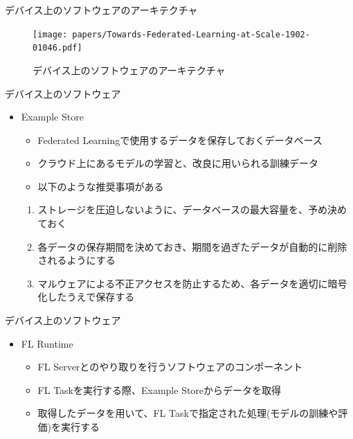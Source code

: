 \documentclass[dvipdfmx,notheorems,t]{beamer}
\begin{document}
\begin{frame}{デバイス上のソフトウェアのアーキテクチャ}

\begin{figure}
	\centering
	\texttt{[image: papers/Towards-Federated-Learning-at-Scale-1902-01046.pdf]}
	\caption{デバイス上のソフトウェアのアーキテクチャ~\cite{DBLP:journals/corr/abs-1902-01046}}
	\label{fig:fl-device-arch}
\end{figure}

\end{frame}

\begin{frame}{デバイス上のソフトウェア}

\begin{itemize}
	\item \alert{Example Store}
	\begin{itemize}
		\item Federated Learningで使用するデータを保存しておくデータベース
		\item クラウド上にあるモデルの学習と、改良に用いられる訓練データ
		\newline
		
		\item 以下のような推奨事項がある
	\end{itemize}
	
	\begin{enumerate}
		\item ストレージを圧迫しないように、データベースの最大容量を、予め決めておく
		\item 各データの保存期間を決めておき、期間を過ぎたデータが自動的に削除されるようにする
		\item マルウェアによる不正アクセスを防止するため、各データを適切に暗号化したうえで保存する
	\end{enumerate}
\end{itemize}

\end{frame}

\begin{frame}{デバイス上のソフトウェア}

\begin{itemize}
	\item \alert{FL Runtime}
	\begin{itemize}
		\item FL Serverとのやり取りを行うソフトウェアのコンポーネント
		\newline
		
		\item FL Taskを実行する際、Example Storeからデータを取得
		\item 取得したデータを用いて、FL Taskで指定された処理(モデルの訓練や評価)を実行する
	\end{itemize}
\end{itemize}

\end{frame}
\end{document}
